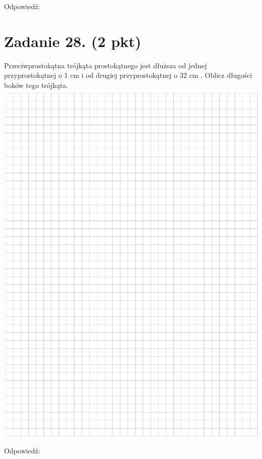 \documentclass[10pt]{article}
\begin{document}
Odpowiedź:

\section*{Zadanie 28. (2 pkt)}
Przeciwprostokątna trójkąta prostokątnego jest dłuższa od jednej przyprostokątnej o 1 cm i od drugiej przyprostokątnej o 32 cm . Oblicz długości boków tego trójkąta.\\
\includegraphics[max width=\textwidth, center]{2024_11_21_603d5c1b2a7d8d68f45fg-13}

Odpowiedź:
\end{document}
